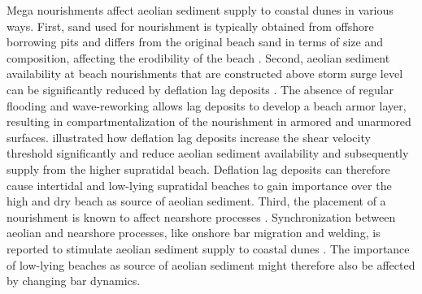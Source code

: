 Mega nourishments affect aeolian sediment supply to coastal dunes in
various ways. First, sand used for nourishment is typically obtained
from offshore borrowing pits and differs from the original beach sand
in terms of size and composition, affecting the erodibility of the
beach \citep{VanDerWal1998, VanDerWal2000}. Second, aeolian sediment
availability \citep[following the definition of][]{Kocurek1999} at
beach nourishments that are constructed above storm surge level can be
significantly reduced by deflation lag deposits
\citep{Jackson2010}. The absence of regular flooding and
wave-reworking allows lag deposits to develop a beach armor layer,
resulting in compartmentalization of the nourishment in armored and
unarmored surfaces. \citet{McKennaNeuman2012, Carter1978, Carter1976}
illustrated how deflation lag deposits increase the shear velocity
threshold significantly and reduce aeolian sediment availability and
subsequently supply from the higher supratidal beach. Deflation lag
deposits can therefore cause intertidal and low-lying supratidal
beaches to gain importance over the high and dry beach as source of
aeolian sediment. Third, the placement of a nourishment is known to
affect nearshore processes \citep{Grunnet2005, Ojeda2008,
  deSchipper2013}.  Synchronization between aeolian and nearshore
processes, like onshore bar migration and welding, is reported to
stimulate aeolian sediment supply to coastal dunes \citep{Houser2009,
  Anthony2013}. The importance of low-lying beaches as source of
aeolian sediment might therefore also be affected by changing bar
dynamics.

%
%


